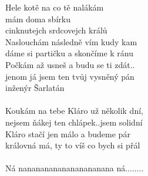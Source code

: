 \begin{multicols}{2}
Hele kotě na co tě nalákám\\
mám doma sbírku\\
cinknutejch srdcovejch králů\\
Naslouchám následně vím kudy kam\\
dáme si partičku a skončíme k ránu\\
Počkám až usneš a budu se ti zdát..\\
jenom já jsem ten tvůj vysněný pán\\
inženýr Šarlatán\\
\columnbreak
\\
Koukám na tebe Kláro už několik     dní,  \\
nejsem ňákej ten chlápek..jsem solidní\\
Kláro stačí jen málo a budeme pár\\
královná má, ty to víš co bych si přál\\
\\
Ná nanananananananananana ná........ \\
\end{multicols}